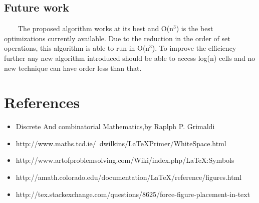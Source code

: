 \documentclass[12pt,a4paper]{article}
\begin{document}
\subsection{Future work}
\ \ \ \ The proposed algorithm works at its best and O(n$^3$) is the best optimizations currently available. Due to the reduction in the order of set operations, this algorithm is able to run in O(n$^3$). To improve the efficiency further any new algorithm introduced should be able to access log(n) cells and no new technique can have order less than that.


\newpage
\section{References}
\begin{itemize}
\item{ Discrete And combinatorial Mathematics,by Raplph P. Grimaldi}
\item{http://www.maths.tcd.ie/~dwilkins/LaTeXPrimer/WhiteSpace.html}
\item{http://www.artofproblemsolving.com/Wiki/index.php/LaTeX:Symbols}
\item{http://amath.colorado.edu/documentation/LaTeX/reference/figures.html}
\item{http://tex.stackexchange.com/questions/8625/force-figure-placement-in-text}
\end{itemize}
\end{document}
